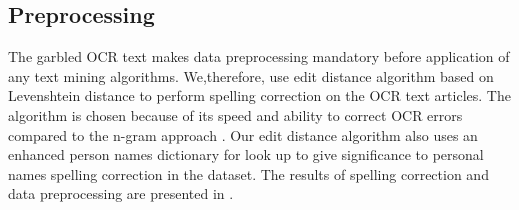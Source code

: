 \subsection{Preprocessing}
The garbled OCR text makes data preprocessing mandatory before application of any text mining algorithms. We,therefore, use edit distance algorithm based on Levenshtein distance to perform spelling correction on the OCR text articles. The algorithm is chosen because of its speed and ability to correct OCR errors compared to the n-gram approach \cite{chattopadhyaya2013fast}. Our edit distance algorithm also uses an enhanced person names dictionary for look up to give significance to personal names spelling correction in the dataset. The results of spelling correction and data preprocessing are presented in \cite{gupta2014finding}.
